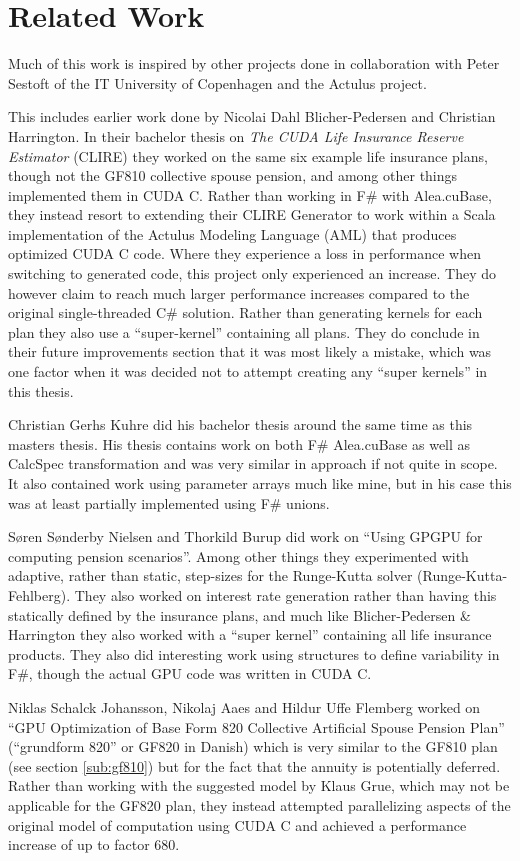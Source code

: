 \section{Related Work}\label{sec:relatedwork}
Much of this work is inspired by other projects done in collaboration with Peter Sestoft of the IT University of Copenhagen and the Actulus project\cite{actulus}.

This includes earlier work done by Nicolai Dahl Blicher-Pedersen and Christian Harrington.
In their bachelor thesis on \emph{The CUDA Life Insurance Reserve Estimator} (CLIRE)\cite{dahlharrington} they worked on the same six example life insurance plans, though not the GF810 collective spouse pension, and among other things implemented them in CUDA C.
Rather than working in F\# with Alea.cuBase, they instead resort to extending their CLIRE Generator to work within a Scala implementation of the Actulus Modeling Language (AML) that produces optimized CUDA C code.
Where they experience a loss in performance when switching to generated code, this project only experienced an increase.
They do however claim to reach much larger performance increases compared to the original single-threaded C\# solution.
Rather than generating kernels for each plan they also use a ``super-kernel'' containing all plans. 
They do conclude in their future improvements section that it was most likely a mistake, which was one factor when it was decided not to attempt creating any ``super kernels'' in this thesis.

Christian Gerhs Kuhre\cite{christiangk} did his bachelor thesis around the same time as this masters thesis.
His thesis contains work on both F\# Alea.cuBase as well as CalcSpec transformation and was very similar in approach if not quite in scope.
It also contained work using parameter arrays much like mine, but in his case this was at least partially implemented using F\# unions.

S\o{}ren S\o{}nderby Nielsen and Thorkild Burup did work on ``Using GPGPU for computing pension scenarios''\cite{nielsenburup}. 
Among other things they experimented with adaptive, rather than static, step-sizes for the Runge-Kutta solver (Runge-Kutta-Fehlberg).
They also worked on interest rate generation rather than having this statically defined by the insurance plans, and much like Blicher-Pedersen \& Harrington they also worked with a ``super kernel'' containing all life insurance products.
They also did interesting work using structures to define variability in F\#, though the actual GPU code was written in CUDA C.

Niklas Schalck Johansson, Nikolaj Aaes and Hildur Uffe Flemberg worked on ``GPU Optimization of Base Form 820 Collective Artificial Spouse Pension Plan''\cite{aaesjohanssonflemberg} (``grundform 820'' or GF820 in Danish) which is very similar to the GF810 plan (see section \ref{sub:gf810}) but for the fact that the annuity is potentially deferred. 
Rather than working with the suggested model by Klaus Grue, which may not be applicable for the GF820 plan, they instead attempted parallelizing aspects of the original model of computation using CUDA C and achieved a performance increase of up to factor 680.
